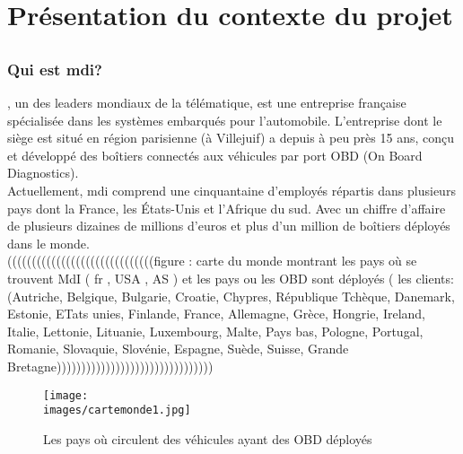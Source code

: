\section{Présentation du contexte du projet}
    \subsection{\company{}}
        \subsubsection{Qui est \texorpdfstring{\gls{mdi}}{MDI}?}
            \company{}\cite{mdi_site}, un des leaders mondiaux de la télématique, est une entreprise
            française spécialisée dans les systèmes embarqués pour l'automobile.
            L’entreprise dont le siège est situé en région parisienne (à Villejuif) a depuis à peu près
            15 ans, conçu et développé des boîtiers connectés aux véhicules par port OBD (On
            Board Diagnostics).\\[0.3cm]
            Actuellement, \gls{mdi} comprend une cinquantaine d’employés répartis dans plusieurs
            pays dont la France, les États-Unis et l’Afrique du sud. Avec un chiffre d’affaire de
            plusieurs dizaines de millions d’euros et plus d’un million de boîtiers déployés dans le
            monde.\\[0.3cm]


            ((((((((((((((((((((((((((((((figure : carte du monde montrant les pays où se trouvent MdI ( fr , USA , AS ) et les 
            pays ou les OBD sont déployés ( les clients:  (Autriche, Belgique, Bulgarie, Croatie, Chypres, République Tchèque, Danemark, Estonie, ETats unies, Finlande, France, Allemagne, Grèce, Hongrie, Ireland, Italie, Lettonie, Lituanie, Luxembourg, Malte, Pays bas, Pologne, Portugal, Romanie, Slovaquie, Slovénie, Espagne, Suède, Suisse, Grande Bretagne))))))))))))))))))))))))))))))))
            \begin{figure}[ht]
                \centering
                \texttt{[image: \\images/cartemonde1.jpg]}
                \caption{Les pays où circulent des véhicules ayant des OBD déployés }
            \end{figure}


